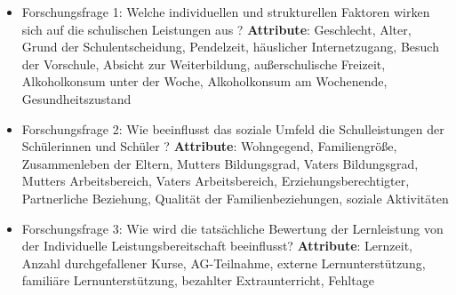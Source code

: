 \begin{itemize}
    \item Forschungsfrage 1: Welche individuellen und strukturellen Faktoren wirken sich auf die schulischen Leistungen aus ?
        \subitem \textbf{Attribute}: Geschlecht, Alter, Grund der Schulentscheidung, Pendelzeit, häuslicher Internetzugang, Besuch der Vorschule, Absicht zur Weiterbildung, außerschulische Freizeit, Alkoholkonsum unter der Woche, Alkoholkonsum am Wochenende, Gesundheitszustand
    \item Forschungsfrage 2: Wie beeinflusst das soziale Umfeld die Schulleistungen der Schülerinnen und Schüler ? 
        \subitem \textbf{Attribute}: Wohngegend, Familiengröße, Zusammenleben der Eltern, Mutters Bildungsgrad, Vaters Bildungsgrad, Mutters Arbeitsbereich, Vaters Arbeitsbereich, Erziehungsberechtigter, Partnerliche Beziehung, Qualität der Familienbeziehungen, soziale Aktivitäten
    \item Forschungsfrage 3: Wie wird die tatsächliche Bewertung der Lernleistung von der Individuelle Leistungsbereitschaft beeinflusst?
        \subitem \textbf{Attribute}: Lernzeit, Anzahl durchgefallener Kurse, AG-Teilnahme, externe Lernunterstützung, familiäre Lernunterstützung, bezahlter Extraunterricht, Fehltage
\end{itemize}
